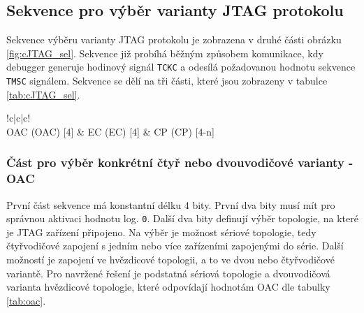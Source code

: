 
\subsection{Sekvence pro výběr varianty \acs{JTAG} protokolu}
Sekvence výběru varianty \acs{JTAG} protokolu je zobrazena v druhé části obrázku \ref{fig:cJTAG_sel}. Sekvence již probíhá běžným způsobem komunikace, kdy debugger generuje hodinový signál \texttt{\acs{TCKC}} a odesílá požadovanou hodnotu sekvence \texttt{\acs{TMSC}} signálem. Sekvence se dělí na tři části, které jsou zobrazeny v tabulce \ref{tab:cJTAG_sel}.

\begin{table}[!h]
  \caption{Formát sekvence pro výběr varianty \acs{JTAG} protokolu \cite{IEEE_1149-7}}
  \begin{center}
  	\small
	  \begin{tabular}{!{\vrule width 1.2pt}c|c|c!{\vrule width 1.2pt}}
				\\
				\hline
				\acl{OAC} (\acs{OAC}) [4] & \acl{EC} (\acs{EC}) [4] & \acl{CP} (\acs{CP}) [4-n]\\
		\end{tabular}
  \end{center}
	\label{tab:cJTAG_sel}
\end{table}

\subsubsection{Část pro výběr konkrétní čtyř nebo dvouvodičové varianty - \acs{OAC}}
První část sekvence má konstantní délku 4 bity. První dva bity musí mít pro správnou aktivaci hodnotu log. \texttt{0}. Další dva bity definují výběr topologie, na které je \acs{JTAG} zařízení připojeno. Na výběr je možnost sériové topologie, tedy čtyřvodičové zapojení s jedním nebo více zařízeními zapojenými do série. Další možností je zapojení ve hvězdicové topologii, a to ve dvou nebo čtyřvodičové variantě. Pro navržené řešení je podstatná sériová topologie a dvouvodičová varianta hvězdicové topologie, které odpovídají hodnotám \acs{OAC} dle tabulky \ref{tab:oac}. \cite{IEEE_1149-7}

